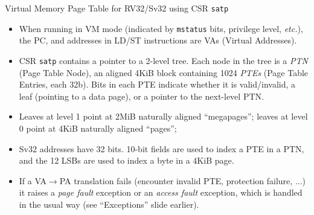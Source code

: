 \documentclass{article}
\newcommand{\etc}{\emph{etc.}}
\begin{document}
\clearpage


\begin{center}
  {\Huge
    Virtual Memory Page Table for RV32/Sv32 using CSR {\tt satp}}

  \vspace*{0.2in}


  \vspace*{0.3in}

  \begin{minipage}[t]{11in}\Large
    \begin{itemize}

    \item When running in VM mode (indicated by {\tt mstatus} bits,
      privilege level, {\etc}), the PC, and addresses in LD/ST
      instructions are VAs (Virtual Addresses).

    \item CSR {\tt satp} contains a pointer to a 2-level tree.  Each
      node in the tree is a \emph{PTN} (Page Table Node), an aligned
      4KiB block containing 1024 \emph{PTEs} (Page Table Entries, each
      32b).  Bits in each PTE indicate whether it is valid/invalid, a
      leaf (pointing to a data page), or a pointer to the next-level
      PTN.

    \item Leaves at level 1 point at 2MiB naturally aligned ``megapages'';
      leaves at level 0 point at 4KiB naturally aligned ``pages'';

    \item Sv32 addresses have 32 bits. 10-bit fields are used to index
      a PTE in a PTN, and the 12 LSBs are used to index a byte in a
      4KiB page.

      \item If a VA$\rightarrow$PA translation fails (encounter
        invalid PTE, protection failure, ...) it raises a \emph{page
        fault} exception or an \emph{access fault} exception, which is
        handled in the usual way (see ``Exceptions'' slide earlier).
    \end{itemize}
  \end{minipage}
\end{center}
\end{document}
